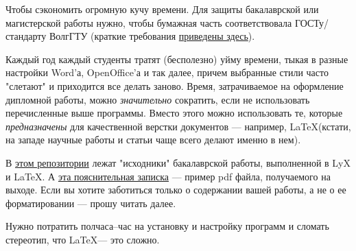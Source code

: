 \documentclass[a4paper,english]{G2-105}
\begin{document}
\tableofcontents

\newpage


Чтобы сэкономить огромную кучу времени. Для защиты бакалаврской или магистерской работы нужно, чтобы бумажная часть соответствовала ГОСТу/стандарту
ВолгГТУ (краткие требования \href{http://wiki.poas.vstu.ru/index.php/%D0%A2%D0%B5%D0%BA%D1%81%D1%82%D0%BE%D0%B2%D1%8B%D0%B9_%D0%B4%D0%BE%D0%BA%D1%83%D0%BC%D0%B5%D0%BD%D1%82}{приведены здесь}).

Каждый год каждый студенты тратят (бесполезно) уйму времени, тыкая в разные настройки Word'а, OpenOffice'а и так далее, причем выбранные стили часто "слетают" и приходится все делать заново. Время, затрачиваемое на оформление дипломной работы, можно \textit{значительно} сократить, если не использовать перечисленные выше программы. Вместо этого можно использовать те, которые \textit{предназначены}
для качественной верстки документов --- например, \LaTeX (кстати, на западе научные работы и статьи чаще всего делают именно в нем).

В \href{https://bitbucket.org/vostreltsov/bachelors-thesis}{этом репозитории} лежат "исходники" бакалаврской работы, выполненной в LyX и \LaTeX. А \href{http://wiki.poas.vstu.ru/img_auth.php/Lyx_bachelors_thesis.pdf}{эта пояснительная записка} --- пример pdf файла, получаемого на выходе. Если вы хотите заботиться только о содержании вашей работы, а не о ее форматировании --- прошу читать далее.


Нужно потратить полчаса--час на установку и настройку программ и сломать стереотип, что \LaTeX --- это сложно.

\end{document}
